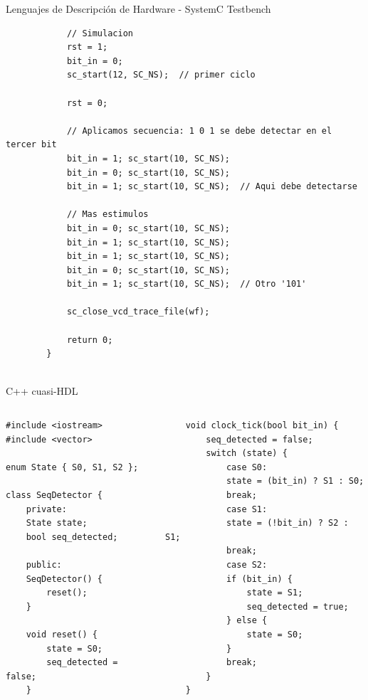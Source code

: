 \documentclass[11pt]{beamer}
\begin{document}
\begin{frame}[fragile]{Lenguajes de Descripción de Hardware - SystemC Testbench}
	\begin{lstlisting}
			// Simulacion
			rst = 1;
			bit_in = 0;
			sc_start(12, SC_NS);  // primer ciclo
			
			rst = 0;
			
			// Aplicamos secuencia: 1 0 1 se debe detectar en el tercer bit
			bit_in = 1; sc_start(10, SC_NS);
			bit_in = 0; sc_start(10, SC_NS);
			bit_in = 1; sc_start(10, SC_NS);  // Aqui debe detectarse
			
			// Mas estimulos
			bit_in = 0; sc_start(10, SC_NS);
			bit_in = 1; sc_start(10, SC_NS);
			bit_in = 1; sc_start(10, SC_NS);
			bit_in = 0; sc_start(10, SC_NS);
			bit_in = 1; sc_start(10, SC_NS);  // Otro '101'
			
			sc_close_vcd_trace_file(wf);
			
			return 0;
		}
		
	\end{lstlisting}
\end{frame}




\begin{frame}[fragile]{C++ cuasi-HDL}
\begin{columns}[t]
\begin{lstlisting}
#include <iostream>
#include <vector>

enum State { S0, S1, S2 };

class SeqDetector {
	private:
	State state;
	bool seq_detected;
	
	public:
	SeqDetector() {
		reset();
	}
	
	void reset() {
		state = S0;
		seq_detected = false;
	}
\end{lstlisting}

\begin{lstlisting}
	void clock_tick(bool bit_in) {
		seq_detected = false;
		switch (state) {
			case S0:
			state = (bit_in) ? S1 : S0;
			break;
			case S1:
			state = (!bit_in) ? S2 : S1;
			break;
			case S2:
			if (bit_in) {
				state = S1;
				seq_detected = true;
			} else {
				state = S0;
			}
			break;
		}
	}
\end{lstlisting}
\end{columns}
\end{frame}
\end{document}
